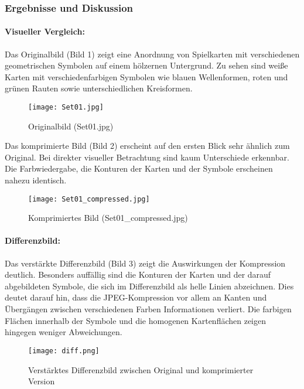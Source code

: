 \documentclass[11pt, a4paper]{article}
\begin{document}
\subsubsection{Ergebnisse und Diskussion}
\paragraph{Visueller Vergleich:}
Das Originalbild (Bild 1) zeigt eine Anordnung von Spielkarten mit verschiedenen geometrischen Symbolen auf einem hölzernen Untergrund. Zu sehen sind weiße Karten mit verschiedenfarbigen Symbolen wie blauen Wellenformen, roten und grünen Rauten sowie unterschiedlichen Kreisformen.

\begin{figure}[H]
    \centering
    \texttt{[image: Set01.jpg]}
    \caption{Originalbild (Set01.jpg)}
    \label{fig:original}
\end{figure}

Das komprimierte Bild (Bild 2) erscheint auf den ersten Blick sehr ähnlich zum Original. Bei direkter visueller Betrachtung sind kaum Unterschiede erkennbar. Die Farbwiedergabe, die Konturen der Karten und der Symbole erscheinen nahezu identisch.

\begin{figure}[H]
    \centering
    \texttt{[image: Set01\_compressed.jpg]}
    \caption{Komprimiertes Bild (Set01\_compressed.jpg)}
    \label{fig:compressed}
\end{figure}

\paragraph{Differenzbild:}
Das verstärkte Differenzbild (Bild 3) zeigt die Auswirkungen der Kompression deutlich. Besonders auffällig sind die Konturen der Karten und der darauf abgebildeten Symbole, die sich im Differenzbild als helle Linien abzeichnen. Dies deutet darauf hin, dass die JPEG-Kompression vor allem an Kanten und Übergängen zwischen verschiedenen Farben Informationen verliert. Die farbigen Flächen innerhalb der Symbole und die homogenen Kartenflächen zeigen hingegen weniger Abweichungen.

\begin{figure}[H]
    \centering
    \texttt{[image: diff.png]}
    \caption{Verstärktes Differenzbild zwischen Original und komprimierter Version}
    \label{fig:difference}
\end{figure}
\end{document}
